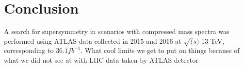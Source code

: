 \documentclass[11pt, oneside]{article}   	%
\begin{document}
\clearpage
\section{Conclusion}
\label{sec:conclusion}
A search for supersymmetry in scenarios with compressed mass spectra was performed using ATLAS data collected in 2015 and 2016 at $\sqrt(s)$ 13 TeV, corresponding to $36.1 fb^{-1}$.
What cool limits we get to put on things because of what we did not see at with LHC data taken by ATLAS detector

\clearpage
\printbibliography
\end{document}

